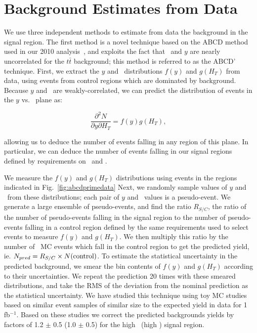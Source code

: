 \section{Background Estimates from Data}
\label{sec:datadriven}
We use three independent methods to estimate from data the background in the signal region.
The first method is a novel technique based on the ABCD method used in our 2010 analysis~\cite{ref:ospaper}, 
and exploits the fact that \HT\ and $y$ are nearly uncorrelated for the $t\bar{t}$ background;
this method is referred to as the ABCD' technique. First, we extract the $y$ and \Ht\ distributions 
$f(y)$ and $g(H_T)$ from data, using events from control regions which are dominated by background. 
Because $y$ and \Ht\ are weakly-correlated, we can predict the distribution of events in the $y$ vs. \Ht\ plane as:

\begin{equation}
\frac{\partial^2 N}{\partial y \partial H_T} = f(y)g(H_T),
\end{equation}

allowing us to deduce the number of events falling in any region of this plane. In particular,
we can deduce the number of events falling in our signal regions defined by requirements on \MET\ and \Ht.

We measure the $f(y)$ and $g(H_T)$ distributions using events in the regions indicated in Fig.~\ref{fig:abcdprimedata}
Next, we randomly sample values of $y$ and \Ht\ from these distributions; each pair of $y$ and \Ht\ values is a pseudo-event.
We generate a large ensemble of pseudo-events, and find the ratio $R_{S/C}$, the ratio of the
number of pseudo-events falling in the signal region to the number of pseudo-events
falling in a control region defined by the same requirements used to select events
to measure $f(y)$ and $g(H_T)$. We then
multiply this ratio by the number of \ttbar\ MC events which fall in the control region
to get the predicted yield, ie. $N_{pred} = R_{S/C} \times N({\rm control})$. 
To estimate the statistical uncertainty in the predicted background, we smear the bin contents
of $f(y)$ and $g(H_T)$ according to their uncertainties. We repeat the prediction 20 times
with these smeared distributions, and take the RMS of the deviation from the nominal prediction
as the statistical uncertainty. We have studied this technique using toy MC studies based on
similar event samples of similar size to the expected yield in data for 1 fb$^{-1}$.
Based on these studies we correct the predicted backgrounds yields by factors of 1.2 $\pm$ 0.5
(1.0 $\pm$ 0.5) for the high \MET\ (high \Ht) signal region.


